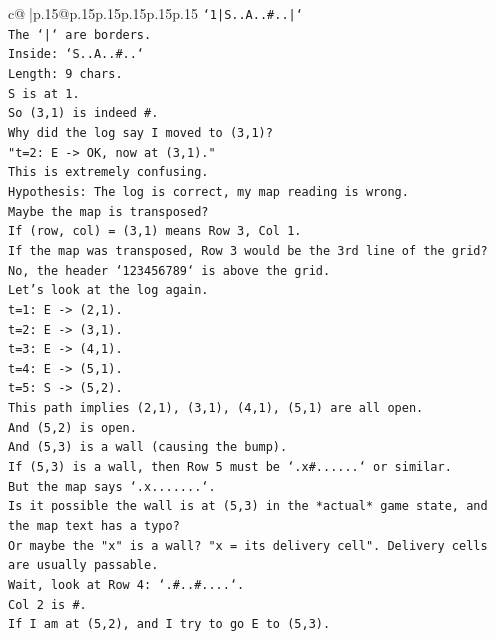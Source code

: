 \documentclass{article}
\begin{document}
{\begin{supertabular}{c@{$\;$}|p{.15\linewidth}@{}p{.15\linewidth}p{.15\linewidth}p{.15\linewidth}p{.15\linewidth}p{.15\linewidth}}
{{{\texttt{`1|S..A..\#..|`} \\
\texttt{The `|` are borders.} \\
\texttt{Inside: `S..A..\#..`} \\
\texttt{Length: 9 chars.} \\
\texttt{S is at 1.} \\
\texttt{So (3,1) is indeed \#.} \\
\texttt{Why did the log say I moved to (3,1)?} \\
\texttt{"t=2: E {-}> OK, now at (3,1)."} \\
\texttt{This is extremely confusing.} \\
\texttt{Hypothesis: The log is correct, my map reading is wrong.} \\
\texttt{Maybe the map is transposed?} \\
\texttt{If (row, col) = (3,1) means Row 3, Col 1.} \\
\texttt{If the map was transposed, Row 3 would be the 3rd line of the grid?} \\
\texttt{No, the header `123456789` is above the grid.} \\
\texttt{Let's look at the log again.} \\
\texttt{t=1: E {-}> (2,1).} \\
\texttt{t=2: E {-}> (3,1).} \\
\texttt{t=3: E {-}> (4,1).} \\
\texttt{t=4: E {-}> (5,1).} \\
\texttt{t=5: S {-}> (5,2).} \\
\texttt{This path implies (2,1), (3,1), (4,1), (5,1) are all open.} \\
\texttt{And (5,2) is open.} \\
\texttt{And (5,3) is a wall (causing the bump).} \\
\texttt{If (5,3) is a wall, then Row 5 must be `.x\#......` or similar.} \\
\texttt{But the map says `.x.......`.} \\
\texttt{Is it possible the wall is at (5,3) in the *actual* game state, and the map text has a typo?} \\
\texttt{Or maybe the "x" is a wall? "x = its delivery cell". Delivery cells are usually passable.} \\
\texttt{Wait, look at Row 4: `.\#..\#....`.} \\
\texttt{Col 2 is \#.} \\
\texttt{If I am at (5,2), and I try to go E to (5,3).} \\
}}}
\end{supertabular}}
\end{document}
